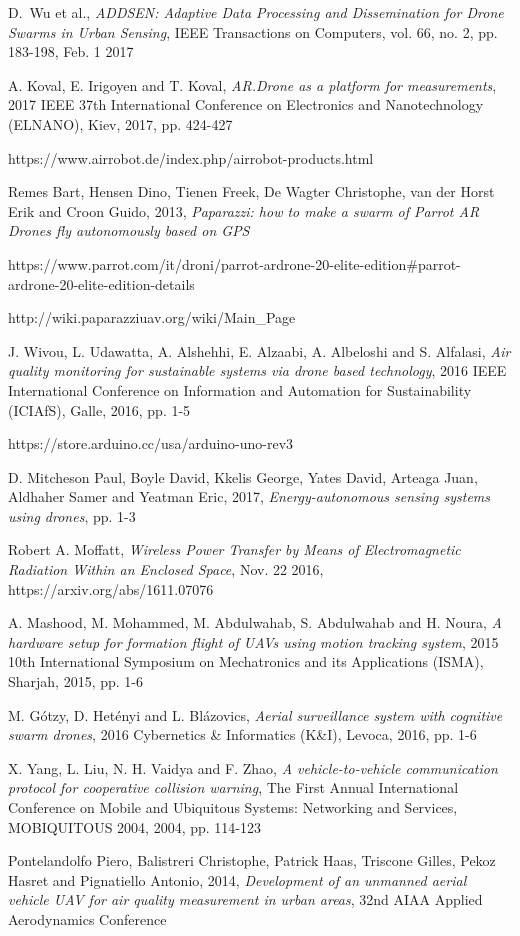 \documentclass[journal]{IEEEtran}
\begin{document}
\begin{thebibliography}{1}
D.~Wu et al., \emph{ADDSEN: Adaptive Data Processing and Dissemination for Drone Swarms in Urban Sensing}, IEEE Transactions on Computers, vol. 66, no. 2, pp. 183-198, Feb. 1 2017

A. Koval, E. Irigoyen and T. Koval, \emph{AR.Drone as a platform for measurements}, 2017 IEEE 37th International Conference on Electronics and Nanotechnology (ELNANO), Kiev, 2017, pp. 424-427

https://www.airrobot.de/index.php/airrobot-products.html

Remes Bart, Hensen Dino, Tienen Freek, De Wagter Christophe, van der Horst Erik and Croon Guido, 2013, \emph{Paparazzi: how to make a swarm of Parrot AR Drones fly autonomously based on GPS}

https://www.parrot.com/it/droni/parrot-ardrone-20-elite-edition\#parrot-ardrone-20-elite-edition-details

http://wiki.paparazziuav.org/wiki/Main\_Page

J. Wivou, L. Udawatta, A. Alshehhi, E. Alzaabi, A. Albeloshi and S. Alfalasi, \emph{Air quality monitoring for sustainable systems via drone based technology}, 2016 IEEE International Conference on Information and Automation for Sustainability (ICIAfS), Galle, 2016, pp. 1-5

https://store.arduino.cc/usa/arduino-uno-rev3

D. Mitcheson Paul, Boyle David, Kkelis George, Yates David, Arteaga Juan, Aldhaher Samer and Yeatman Eric, 2017, \emph{Energy-autonomous sensing systems using drones}, pp. 1-3

Robert A. Moffatt, \emph{Wireless Power Transfer by Means of Electromagnetic Radiation Within an Enclosed Space}, Nov. 22 2016, https://arxiv.org/abs/1611.07076

A. Mashood, M. Mohammed, M. Abdulwahab, S. Abdulwahab and H. Noura, \emph{A hardware setup for formation flight of UAVs using motion tracking system}, 2015 10th International Symposium on Mechatronics and its Applications (ISMA), Sharjah, 2015, pp. 1-6

M. Gótzy, D. Hetényi and L. Blázovics, \emph{Aerial surveillance system with cognitive swarm drones}, 2016 Cybernetics \& Informatics (K\&I), Levoca, 2016, pp. 1-6

X. Yang, L. Liu, N. H. Vaidya and F. Zhao, \emph{A vehicle-to-vehicle communication protocol for cooperative collision warning}, The First Annual International Conference on Mobile and Ubiquitous Systems: Networking and Services, MOBIQUITOUS 2004, 2004, pp. 114-123

Pontelandolfo Piero, Balistreri Christophe, Patrick Haas, Triscone Gilles, Pekoz Hasret and Pignatiello Antonio, 2014, \emph{Development of an unmanned aerial vehicle UAV for air quality measurement in urban areas}, 32nd AIAA Applied Aerodynamics Conference 


\end{thebibliography}
\end{document}
